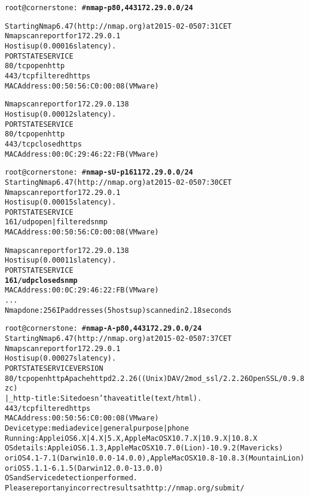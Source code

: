 \documentclass[Screen16to9,17pt]{foils}
\begin{document}

\begin{alltt}\small
root@cornerstone:~#{\bfseries  nmap -p80,443 172.29.0.0/24}

Starting Nmap 6.47 ( http://nmap.org ) at 2015-02-05 07:31 CET
Nmap scan report for 172.29.0.1
Host is up (0.00016s latency).
PORT    STATE    SERVICE
{\color{darkgreen}80/tcp  open     http}
443/tcp filtered https
MAC Address: 00:50:56:C0:00:08 (VMware)

Nmap scan report for 172.29.0.138
Host is up (0.00012s latency).
PORT    STATE  SERVICE
{\color{darkgreen}80/tcp  open   http}
443/tcp closed https
MAC Address: 00:0C:29:46:22:FB (VMware)

\end{alltt}


\begin{alltt}\small
root@cornerstone:~#{\bfseries nmap -sU -p 161 172.29.0.0/24}
Starting Nmap 6.47 ( http://nmap.org ) at 2015-02-05 07:30 CET
Nmap scan report for 172.29.0.1
Host is up (0.00015s latency).
PORT    STATE         SERVICE
{\color{darkgreen}161/udp open|filtered snmp}
MAC Address: 00:50:56:C0:00:08 (VMware)

Nmap scan report for 172.29.0.138
Host is up (0.00011s latency).
PORT    STATE  SERVICE
{\bf{161/udp closed snmp}}
MAC Address: 00:0C:29:46:22:FB (VMware)
...
Nmap done: 256 IP addresses (5 hosts up) scanned in 2.18 seconds
\end{alltt}

\begin{alltt}\footnotesize
root@cornerstone:~#{\bfseries nmap -A -p80,443 172.29.0.0/24}
Starting Nmap 6.47 ( http://nmap.org ) at 2015-02-05 07:37 CET
Nmap scan report for 172.29.0.1
Host is up (0.00027s latency).
PORT    STATE    SERVICE VERSION
80/tcp  open     http    Apache httpd 2.2.26 ((Unix) DAV/2 mod_ssl/2.2.26 OpenSSL/0.9.8zc)
|_http-title: Site doesn't have a title (text/html).
443/tcp filtered https
MAC Address: 00:50:56:C0:00:08 (VMware)
Device type: media device|general purpose|phone
Running: Apple iOS 6.X|4.X|5.X, Apple Mac OS X 10.7.X|10.9.X|10.8.X
OS details: Apple iOS 6.1.3, Apple Mac OS X 10.7.0 (Lion) - 10.9.2 (Mavericks)
or iOS 4.1 - 7.1 (Darwin 10.0.0 - 14.0.0), Apple Mac OS X 10.8 - 10.8.3 (Mountain Lion)
or iOS 5.1.1 - 6.1.5 (Darwin 12.0.0 - 13.0.0)
OS and Service detection performed.
Please report any incorrect results at http://nmap.org/submit/
\end{alltt}
\end{document}
